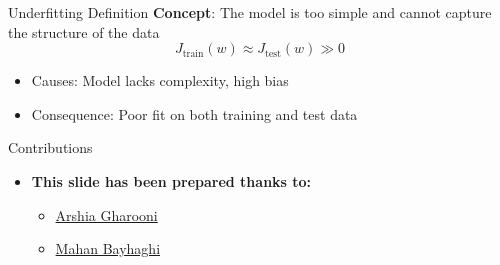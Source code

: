 \documentclass[serif, aspectratio=169]{beamer}
\begin{document}
\begin{frame}{Underfitting Definition}
    \textbf{Concept}: The model is too simple and cannot capture the structure of the data
    \[
    J_{\text{train}}(w) \approx J_{\text{test}}(w) \gg 0
    \]
    \begin{itemize}
        \item Causes: Model lacks complexity, high bias
        \item Consequence: Poor fit on both training and test data
    \end{itemize}
\end{frame}






\begin{frame}{Contributions}
\begin{itemize}
\item \textbf{This slide has been prepared thanks to:}
\begin{itemize}
    \setlength{\itemsep}{10pt} %
    \item \href{https://silentdrift.github.io/}{Arshia Gharooni}
    \item \href{https://github.com/Mahan-Bayhaghi}{Mahan Bayhaghi}
\end{itemize}
\end{itemize}

\end{frame}
\end{document}
